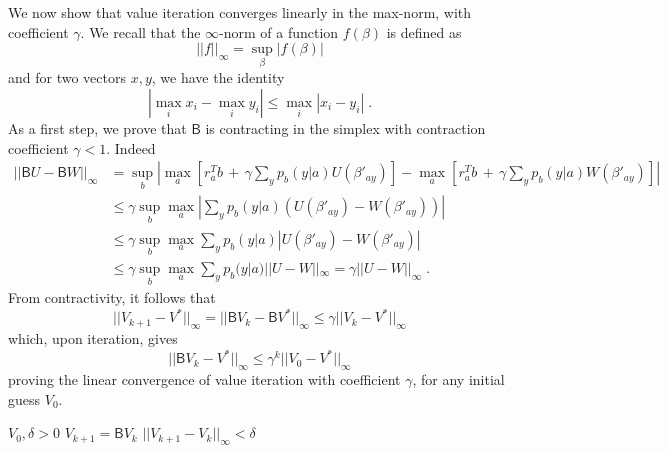 \documentclass[aps,nofootinbib,groupaddress,superscriptaddress,reprint,amsmath,amssymb,graphicx,onecolumn,prx]{revtex4-2}
\begin{document}
We now show that value iteration converges linearly in the max-norm, with coefficient $\gamma$. We recall that the $\infty$-norm of a function $f(\beta)$ is defined as
\begin{equation}
    ||f||_\infty = \sup_\beta |f(\beta)|
\end{equation}
and for two vectors $x, y$, we have the identity
\begin{equation}
    |\max_i x_i - \max_i y_i| \le \max_i |x_i-y_i| \; .
\end{equation}
As a first step, we prove that $\mathsf{B}$ is contracting in the simplex with contraction coefficient $\gamma<1$. Indeed
\begin{align}
    ||\mathsf{B}U-\mathsf{B}W||_\infty & = \sup_b \left|\max_a \left[r_a^Tb\,+\,\gamma  \sum_yp_b(y|a)U(\beta'_{ay})\right] -\max_a \left[r_a^Tb\,+\,\gamma  \sum_yp_b(y|a)W(\beta'_{ay})\right] \right| \nonumber \\
    & \le \gamma \sup_b \max_a \left|\sum_yp_b(y|a)(U(\beta'_{ay})- W(\beta'_{ay}))\right| \nonumber \\
    & \le \gamma \sup_b\max_{a} \sum_yp_b(y|a)\left|U(\beta'_{ay})- W(\beta'_{ay})\right| \nonumber \\
    & \le \gamma \sup_b\max_{a} \sum_yp_b(y|a)||U-W||_\infty =\gamma ||U-W||_\infty \; .
\end{align}
From contractivity, it follows that
\begin{equation}
    ||V_{k+1}-V^*||_\infty =||\mathsf{B}V_{k}-\mathsf{B}V^*||_\infty \le \gamma ||V_k-V^*||_\infty
\end{equation}
which, upon iteration, gives
\begin{equation}
    ||\mathsf{B}V_k - V^*||_\infty \le \gamma^k ||V_0-V^*||_\infty
\end{equation}
proving the linear convergence of value iteration with coefficient $\gamma$, for any initial guess $V_0$.

\begin{center}
\begin{minipage}{0.5\textwidth}
\begin{algorithm}[H]%
\caption{Value iteration}\label{alg:vi}
\begin{algorithmic}
\State $V_0,\delta>0$
\Repeat
\State $V_{k+1}  = \mathsf{B}V_k$ 
\Until $||V_{k+1}-V_k||_\infty <\delta$ 
\end{algorithmic}
\end{algorithm}
\end{minipage}
\end{center}
\end{document}

